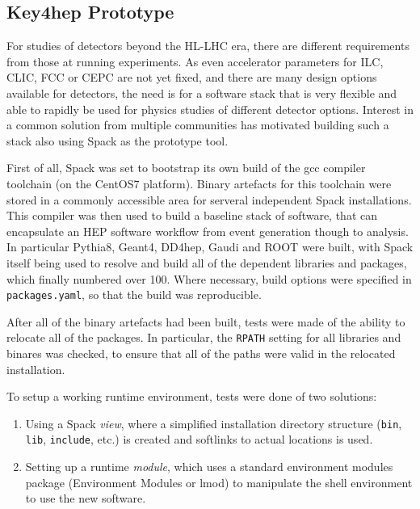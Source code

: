 \documentclass{webofc}
\begin{document}
\subsection{Key4hep Prototype}
\label{key4hep}

For studies of detectors beyond the HL-LHC era, there are different
requirements from those at running experiments. As even accelerator parameters
for ILC\cite{bambade2019international}, CLIC\cite{Boland:2210892},
FCC\cite{Benedikt:2653673} or CEPC\cite{group2018cepc} are not yet fixed, and
there are many design options available for detectors, the need is for a
software stack that is very flexible and able to rapidly be used for
physics studies of different detector options. Interest in a common solution
from multiple communities\cite{key4hep} has motivated 
building such a stack also using Spack as the prototype tool.

First of all, Spack was set to bootstrap its own build of the gcc compiler
toolchain (on the CentOS7 platform). Binary artefacts for this toolchain were
stored in a commonly accessible area for serveral independent Spack
installations. This compiler was then used to build a baseline stack of
software, that can encapsulate an HEP software workflow from event generation
though to analysis. In particular Pythia8, Geant4, DD4hep, Gaudi and ROOT were
built, with Spack itself being used to resolve and build all of the dependent
libraries and packages, which finally numbered over 100. Where necessary, build
options were specified in \texttt{packages.yaml}, so that the build was
reproducible.

After all of the binary artefacts had been built, tests were made of the 
ability to relocate all of the packages. In particular, the \texttt{RPATH}
setting for all libraries and binares was checked, to ensure that
all of the paths were valid in the relocated installation.

To setup a working runtime environment, tests were done of two solutions:

\begin{enumerate}
    \item Using a Spack \emph{view}, where a simplified installation directory
    structure (\texttt{bin}, \texttt{lib}, \texttt{include}, etc.) is created
    and softlinks to actual locations is used.
    \item Setting up a runtime \emph{module}, which uses a standard environment
    modules package (Environment Modules or lmod) to manipulate the shell environment
    to use the new software.
\end{enumerate}
\end{document}
